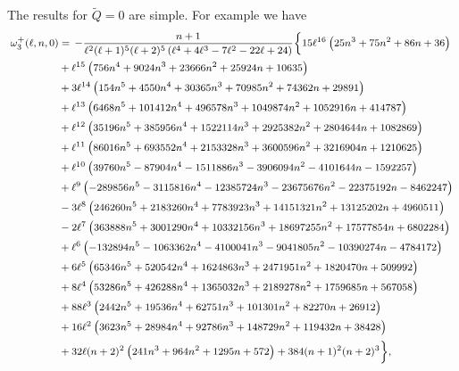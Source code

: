 \documentclass[11pt]{article}
\numberwithin{equation}{section}
\begin{document}
The results for $\tilde{Q}=0$ are simple. For example we have
\begin{equation}\footnotesize
\begin{aligned}
\omega_3^+(\ell,n,0)&=\,-\frac{n+1}{\ell^2 (\ell+1)^5 (\ell+2)^5 \left(\ell^4+4 \ell^3-7 \ell^2-22 \ell+24\right)}\biggl\{15 \ell^{16} \left(25 n^3+75 n^2+86 n+36\right)\\
&+\ell^{15} \left(756 n^4+9024 n^3+23666 n^2+25924 n+10635\right)\\
&+3 \ell^{14} \left(154 n^5+4550 n^4+30365 n^3+70985 n^2+74362 n+29891\right)\\
&+\ell^{13} \left(6468 n^5+101412 n^4+496578 n^3+1049874 n^2+1052916 n+414787\right)\\
&+\ell^{12} \left(35196 n^5+385956 n^4+1522114 n^3+2925382 n^2+2804644 n+1082869\right)\\
&+\ell^{11} \left(86016 n^5+693552 n^4+2153328 n^3+3600596 n^2+3216904 n+1210625\right)\\
&+\ell^{10} \left(39760 n^5-87904 n^4-1511886 n^3-3906094 n^2-4101644 n-1592257\right)\\
&+\ell^9 \left(-289856 n^5-3115816 n^4-12385724 n^3-23675676 n^2-22375192 n-8462247\right)\\
&-3 \ell^8 \left(246260 n^5+2183260 n^4+7783923 n^3+14151321 n^2+13125202 n+4960511\right)\\
&-2 \ell^7 \left(363888 n^5+3001290 n^4+10332156 n^3+18697255 n^2+17577854 n+6802284\right)\\
&+\ell^6 \left(-132894 n^5-1063362 n^4-4100041 n^3-9041805 n^2-10390274 n-4784172\right)\\
&+6 \ell^5 \left(65346 n^5+520542 n^4+1624863 n^3+2471951 n^2+1820470 n+509992\right)\\
&+8 \ell^4 \left(53286 n^5+426288 n^4+1365032 n^3+2189278 n^2+1759685 n+567058\right)\\
&+88 \ell^3 \left(2442 n^5+19536 n^4+62751 n^3+101301 n^2+82270 n+26912\right)\\
&+16 \ell^2 \left(3623 n^5+28984 n^4+92786 n^3+148729 n^2+119432 n+38428\right)\\
&+32 \ell (n+2)^2 \left(241 n^3+964 n^2+1295 n+572\right)+384 (n+1)^2 (n+2)^3\biggr\},
\end{aligned}
\end{equation}
\end{document}
